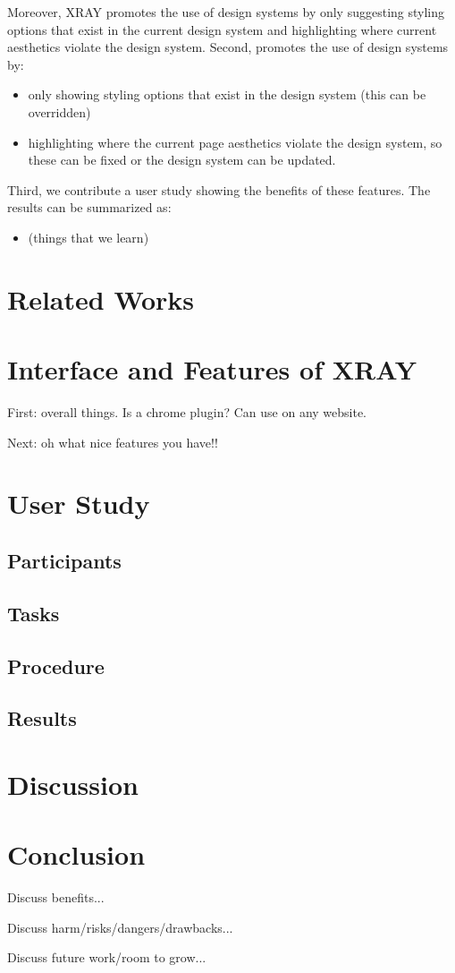 \documentclass{sigchi-ext}
\begin{document}
Moreover, XRAY promotes the use of design systems by only suggesting styling options that exist in the current design system and highlighting where current aesthetics violate the design system. 
Second, promotes the use of design systems by: 
\begin{itemize}
    \item only showing styling options that exist in the design system (this can be overridden) 
    \item highlighting where the current page aesthetics violate the design system, so these can be fixed or the design system can be updated.
\end{itemize}{}

Third, we contribute a user study showing the benefits of these features. The results can be summarized as: 
\begin{itemize}
    \item (things that we learn)
\end{itemize}

\section{Related Works}

\section{Interface and Features of XRAY}
First: overall things. Is a chrome plugin? Can use on any website. 

Next: oh what nice features you have!!
\section{User Study}
\subsection{Participants}
\subsection{Tasks}
\subsection{Procedure}
\subsection{Results}

\section{Discussion}

\section{Conclusion}
Discuss benefits...

Discuss harm/risks/dangers/drawbacks...

Discuss future work/room to grow...










\balance{} 



\end{document}

